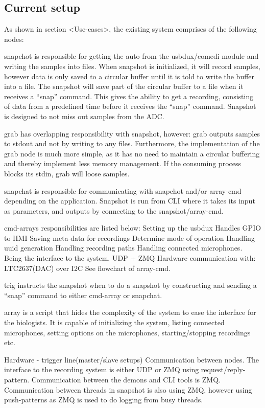 \subsection{Current setup}

As shown in section <Use-cases>, the existing system comprises of the following nodes:

snapchot is responsible for getting the auto from the usbdux/comedi module and writing the samples into files. When snapshot is initialized, it will record samples, however data is only saved to a circular buffer until it is told to write the buffer into a file. The snapshot will save part of the circular buffer to a file when it receives a “snap” command. This gives the ability to get a recording, consisting of data from a predefined time before it receives the “snap” command. Snapshot is designed to not miss out samples from the ADC.

grab has overlapping responsibility with snapshot, however: grab outputs samples to stdout and not by writing to any files. Furthermore, the implementation of the grab node is much more simple, as it has no need to maintain a circular buffering and thereby implement less memory management. If the consuming process blocks its stdin, grab will loose samples.

snapchat is responsible for communicating with snapchot and/or array-cmd depending on the application. Snapshot is run from CLI where it takes its input as parameters, and outputs by connecting to the snapshot/array-cmd.

cmd-arrays responsibilities are listed below:
Setting up the usbdux 
Handles GPIO to HMI
Saving meta-data for recordings
Determine mode of operation
Handling uuid generation
Handling recording paths
Handling connected microphones.
Being the interface to the system.
UDP + ZMQ
Hardware communication with:
LTC2637(DAC) over I2C
See flowchart of array-cmd.

trig instructs the snapshot when to do a snapshot by constructing and sending a “snap” command to either cmd-array or snapchat.

array is a script that hides the complexity of the system to ease the interface for the biologists. It is capable of initializing the system, listing connected microphones, setting options on the microphones, starting/stopping recordings etc.

Hardware - trigger line(master/slave setups)
Communication between nodes.
The interface to the recording system is either UDP or ZMQ using request/reply-pattern. Communication between the demons and CLI tools is ZMQ. Communication between threads in snapshot is also using ZMQ, however using push-patterns as ZMQ is used to do logging from busy threads.

